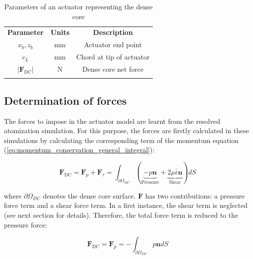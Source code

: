 \begin{table}[!h]
\centering
\caption{Parameters of an actuator representing the dense core}
\begin{tabular}{ccc}
\thickhline
\textbf{Parameter} & \textbf{Units} & \textbf{Description} \\ 
\thickhline
$x_b, z_b$ & mm & Actuator end point  \\
$c_L$ & mm & Chord at tip of actuator \\
$| \textbf{F}_\mathrm{DC} |$ & N & Dense core net force\\
\thickhline 
\end{tabular}
\label{tab:alm_parameters}
\end{table}


\subsection{Determination of forces}
\label{subsec:ch4_ALM_forces_determination}

The forces to impose in the actuator model are learnt from the resolved atomization simulation. For this purpose, the forces are firstly calculated in these simulations by calculating the corresponding term of the momentum equation (\ref{eq:momentum_conservation_general_integral}):

\begin{equation}
\boldsymbol{F}_\mathrm{DC} = \boldsymbol{F}_p + \boldsymbol{F}_\tau = \int_{\partial \Omega_{DC}} \left( \underbrace{- p \boldsymbol{n}}_{\mathrm{Pressure}} + \underbrace{2 \mu \overline{\overline{\epsilon}} \boldsymbol{n}}_{\mathrm{Shear}}  \right) dS 
\end{equation}

where $\partial \Omega_{DC}$ denotes the dense core surface. $\boldsymbol{F} $ has two contributions: a pressure force term and a shear force term. In a first instance, the shear term is neglected (see next section for details). Therefore, the total force term is reduced to the pressure force:

\begin{equation}
\label{eq:ALM_Fp_complete_integral}
\boldsymbol{F}_\mathrm{DC} = \boldsymbol{F}_p = - \int_{\partial \Omega_{DC}} p \boldsymbol{n} dS 
\end{equation}

